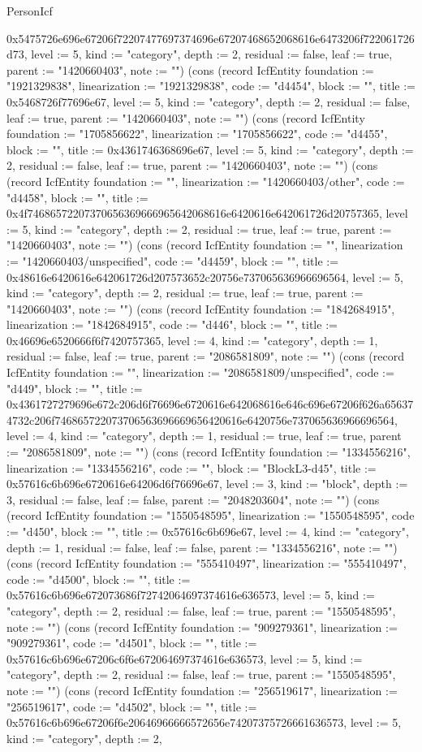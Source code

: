 \begin{lexlean}{PersonIcf}
\begin{semanticmodule}
{0x5475726e696e67206f72207477697374696e67207468652068616e6473206f722061726d73, level := 5, kind := "category", depth := 2, residual := false, leaf := true, parent := "1420660403", note := ""}) (cons (record IcfEntity {foundation := "1921329838", linearization := "1921329838", code := "d4454", block := "", title := 0x5468726f77696e67, level := 5, kind := "category", depth := 2, residual := false, leaf := true, parent := "1420660403", note := ""}) (cons (record IcfEntity {foundation := "1705856622", linearization := "1705856622", code := "d4455", block := "", title := 0x4361746368696e67, level := 5, kind := "category", depth := 2, residual := false, leaf := true, parent := "1420660403", note := ""}) (cons (record IcfEntity {foundation := "", linearization := "1420660403/other", code := "d4458", block := "", title := 0x4f74686572207370656369666965642068616e6420616e642061726d20757365, level := 5, kind := "category", depth := 2, residual := true, leaf := true, parent := "1420660403", note := ""}) (cons (record IcfEntity {foundation := "", linearization := "1420660403/unspecified", code := "d4459", block := "", title := 0x48616e6420616e642061726d207573652c20756e737065636966696564, level := 5, kind := "category", depth := 2, residual := true, leaf := true, parent := "1420660403", note := ""}) (cons (record IcfEntity {foundation := "1842684915", linearization := "1842684915", code := "d446", block := "", title := 0x46696e6520666f6f7420757365, level := 4, kind := "category", depth := 1, residual := false, leaf := true, parent := "2086581809", note := ""}) (cons (record IcfEntity {foundation := "", linearization := "2086581809/unspecified", code := "d449", block := "", title := 0x4361727279696e672c206d6f76696e6720616e642068616e646c696e67206f626a656374732c206f746865722073706563696669656420616e6420756e737065636966696564, level := 4, kind := "category", depth := 1, residual := true, leaf := true, parent := "2086581809", note := ""}) (cons (record IcfEntity {foundation := "1334556216", linearization := "1334556216", code := "", block := "BlockL3-d45", title := 0x57616c6b696e6720616e64206d6f76696e67, level := 3, kind := "block", depth := 3, residual := false, leaf := false, parent := "2048203604", note := ""}) (cons (record IcfEntity {foundation := "1550548595", linearization := "1550548595", code := "d450", block := "", title := 0x57616c6b696e67, level := 4, kind := "category", depth := 1, residual := false, leaf := false, parent := "1334556216", note := ""}) (cons (record IcfEntity {foundation := "555410497", linearization := "555410497", code := "d4500", block := "", title := 0x57616c6b696e672073686f72742064697374616e636573, level := 5, kind := "category", depth := 2, residual := false, leaf := true, parent := "1550548595", note := ""}) (cons (record IcfEntity {foundation := "909279361", linearization := "909279361", code := "d4501", block := "", title := 0x57616c6b696e67206c6f6e672064697374616e636573, level := 5, kind := "category", depth := 2, residual := false, leaf := true, parent := "1550548595", note := ""}) (cons (record IcfEntity {foundation := "256519617", linearization := "256519617", code := "d4502", block := "", title := 0x57616c6b696e67206f6e20646966666572656e74207375726661636573, level := 5, kind := "category", depth := 2, }
\end{semanticmodule}
\end{lexlean}
